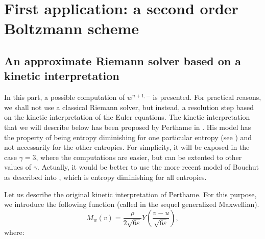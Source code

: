\documentclass{fldauth}
\theoremstyle{plain}
\theoremstyle{plain}
\theoremstyle{plain}
\theoremstyle{plain}
\theoremstyle{plain}
\theoremstyle{plain}
\begin{document}
\section{First application: a second order Boltzmann scheme}


\subsection{An approximate Riemann solver based on a kinetic interpretation}

In this part, a possible computation of \( w^{n+1,-} \) is
presented. For practical reasons, we shall not use a classical
Riemann solver, but instead, a resolution step based on the
kinetic interpretation of the Euler equations. The kinetic
interpretation that we will describe below has been proposed by
Perthame in \cite{perthame90}. His model has the property of being
entropy diminishing for one particular entropy (see
\cite{perthame90}) and not necessarily for the other entropies.
For simplicity, it will be exposed in the case \( \gamma =3 \),
where the computations are easier, but can be extented to other
values of \( \gamma  \). Actually, it would be better to use the
more recent model of Bouchut as described into \cite{bouchut99},
which is entropy diminishing for all entropies.

Let us describe the original kinetic interpretation of Perthame.
For this purpose, we introduce the following function (called in
the sequel generalized Maxwellian).
\begin{equation}\label{maxwell} M_{w}(v)=\frac{\rho
}{2\sqrt{6\varepsilon }}Y(\frac{v-u}{\sqrt{6\varepsilon }}),
\end{equation}
 where:
\end{document}
